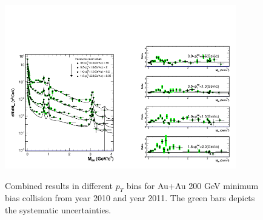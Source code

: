 \begin{figure}
\begin{centering}
\includegraphics[width=0.45\textwidth]{fig/3.Analysis/Run11/pT_Yield_cocktail_Combined}\includegraphics[width=0.45\textwidth]{fig/3.Analysis/Run11/pT_ratio_Combined}
\par\end{centering}

\protect\caption{Combined results in different $p_{T}$ bins for Au+Au 200 GeV minimum
bias collision from year 2010 and year 2011. The green bars depicts
the systematic uncertainties.}


\label{fig: comb pT}
\end{figure}



